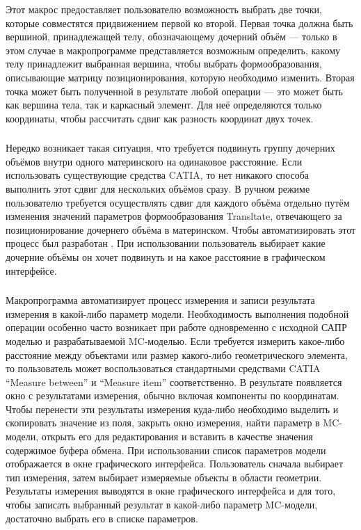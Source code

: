 Этот макрос предоставляет пользователю возможность выбрать две точки, которые совместятся придвижением первой ко второй. Первая точка должна быть вершиной, принадлежащей телу, обозначающему дочерний объём --- только в этом случае в макропрограмме представляется возможным определить, какому телу принадлежит выбранная вершина, чтобы выбрать формообразования, описывающие матрицу позиционирования, которую необходимо изменить. Вторая точка может быть полученной в результате любой операции --- это может быть как вершина тела, так и каркасный элемент. Для неё определяются только координаты, чтобы рассчитать сдвиг как разность координат двух точек.

\subsubsection{}\label{sec:Mover}

Нередко возникает такая ситуация, что требуется подвинуть группу дочерних объёмов внутри одного материнского на одинаковое расстояние. Если использовать существующие средства CATIA, то нет никакого способа выполнить этот сдвиг для нескольких объёмов сразу. В ручном режиме пользователю требуется осуществлять сдвиг для каждого объёма отдельно путём изменения значений параметров формообразования Transltate, отвечающего за позиционирование дочернего объёма в материнском. Чтобы автоматизировать этот процесс был разработан . При использовании  пользователь выбирает какие дочерние объёмы он хочет подвинуть и на какое расстояние в графическом интерфейсе.

\subsubsection{}\label{sec:Measure}

Макропрограмма  автоматизирует процесс измерения и записи результата измерения в какой-либо параметр модели. Необходимость выполнения подобной операции особенно часто возникает при работе одновременно с исходной САПР моделью и разрабатываемой MC-моделью. Если требуется измерить какое-либо расстояние между объектами или размер какого-либо геометрического элемента, то пользователь может воспользоваться стандартными средствами CATIA ``Measure between'' и ``Measure item'' соответственно. В результате появляется окно с результатами измерения, обычно включая компоненты по координатам. Чтобы перенести эти результаты измерения куда-либо необходимо выделить и скопировать значение из поля, закрыть окно измерения, найти параметр в MC-модели, открыть его для редактирования и вставить в качестве значения содержимое буфера обмена. При использовании  список параметров модели отображается в окне графического интерфейса. Пользователь сначала выбирает тип измерения, затем выбирает измеряемые объекты в области геометрии. Результаты измерения выводятся в окне графического интерфейса и для того, чтобы записать выбранный результат в какой-либо параметр MC-модели, достаточно выбрать его в списке параметров.

